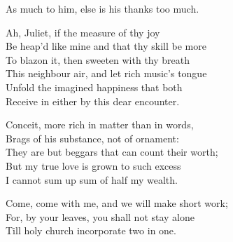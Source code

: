 \begin{speech}
As much to him, else is his thanks too much. \\
\end{speech}
\begin{speech}
Ah, Juliet, if the measure of thy joy \\
Be heap'd like mine and that thy skill be more \\
To blazon it, then sweeten with thy breath \\
This neighbour air, and let rich music's tongue \\
Unfold the imagined happiness that both \\
Receive in either by this dear encounter. \\
\end{speech}
\begin{speech}
Conceit, more rich in matter than in words, \\
Brags of his substance, not of ornament: \\
They are but beggars that can count their worth; \\
But my true love is grown to such excess \\
I cannot sum up sum of half my wealth. \\
\end{speech}
\begin{speech}
Come, come with me, and we will make short work;
\\
For, by your leaves, you shall not stay alone \\
Till holy church incorporate two in one.  \\

\end{speech}




